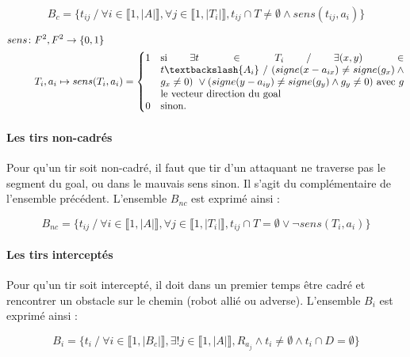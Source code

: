 \documentclass{article}
\begin{document}
\begin{equation*}
    B_c = \{ t_{ij} \ / \ \forall i \in \llbracket 1, |A| \rrbracket, \forall j \in \llbracket 1, |T_i| \rrbracket, t_{ij} \cap T \ne \emptyset \wedge sens(t_{ij}, a_i) \}
\end{equation*}

\begin{align*}
  sens \colon & F^2, F^2\to \{0, 1 \}\\
  &T_i, a_i \mapsto sens(T_i, a_i) = \begin{cases}
                                   1 & \parbox[t]{.7\textwidth}{si $\exists t \in T_i\ / \ \exists (x, y) \in t \textbackslash \{A_i \} \ / \ (signe(x-a_{ix}) \ne signe(g_x) \wedge g_x \ne 0) \ \vee (signe(y-a_{iy}) \ne signe(g_y) \wedge g_y \ne 0)$ avec $g$ le vecteur direction du goal} \\
                                   0 & \text{sinon.}
  \end{cases}
\end{align*}


\paragraph{Les tirs non-cadrés}
Pour qu'un tir soit non-cadré, il faut que tir d'un attaquant ne traverse pas le segment du goal, ou dans le mauvais sens sinon. Il s'agit du complémentaire de l'ensemble précédent. L'ensemble $B_{nc}$ est exprimé ainsi :

\begin{equation*}
    B_{nc} = \{ t_{ij} \ / \ \forall i \in \llbracket 1, |A| \rrbracket, \forall j \in \llbracket 1, |T_i| \rrbracket, t_{ij} \cap T = \emptyset \vee \neg sens(T_i, a_i) \}
\end{equation*}

\paragraph{Les tirs interceptés}
Pour qu'un tir soit intercepté, il doit dans un premier temps être cadré et rencontrer un obstacle sur le chemin (robot allié ou adverse). L'ensemble $B_i$ est exprimé ainsi :

\begin{equation*}
    B_i = \{  t_i \ / \ \forall i \in \llbracket 1, |B_c| \rrbracket, \exists ! j \in \llbracket 1, |A| \rrbracket, R_{a_j} \wedge t_i \ne \emptyset \wedge t_i \cap D = \emptyset \}
\end{equation*}
\end{document}
